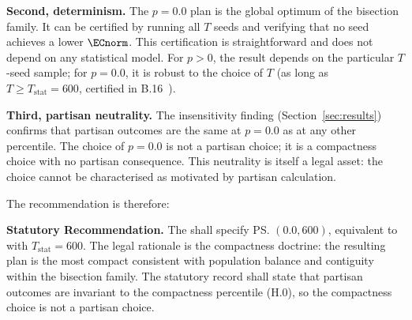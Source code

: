 \textbf{Second, determinism.}
The $p = 0.0$ plan is the global optimum of the bisection family.
It can be certified by running all $T$ seeds and verifying that no seed
achieves a lower $\ECnorm$.
This certification is straightforward and does not depend on any statistical
model.
For $p > 0$, the result depends on the particular $T$-seed sample; for
$p = 0.0$, it is robust to the choice of $T$ (as long as $T \geq T_{\mathrm{stat}}
= 600$, certified in B.16~\citep{b16paper}).

\textbf{Third, partisan neutrality.}
The insensitivity finding (Section~\ref{sec:results}) confirms that
partisan outcomes are the same at $p = 0.0$ as at any other percentile.
The choice of $p = 0.0$ is not a partisan choice; it is a compactness
choice with no partisan consequence.
This neutrality is itself a legal asset: the choice cannot be characterised
as motivated by partisan calculation.

The recommendation is therefore:
\begin{statute}
\textbf{Statutory Recommendation.}
The \dia{} shall specify \ps{}$(0.0, 600)$, equivalent to \cs{} with
$T_{\mathrm{stat}} = 600$.
The legal rationale is the compactness doctrine: the resulting plan is the
most compact consistent with population balance and contiguity within the
\ar{} bisection family.
The statutory record shall state that partisan outcomes are invariant to
the compactness percentile (H.0), so the compactness choice is not a
partisan choice.
\end{statute}

